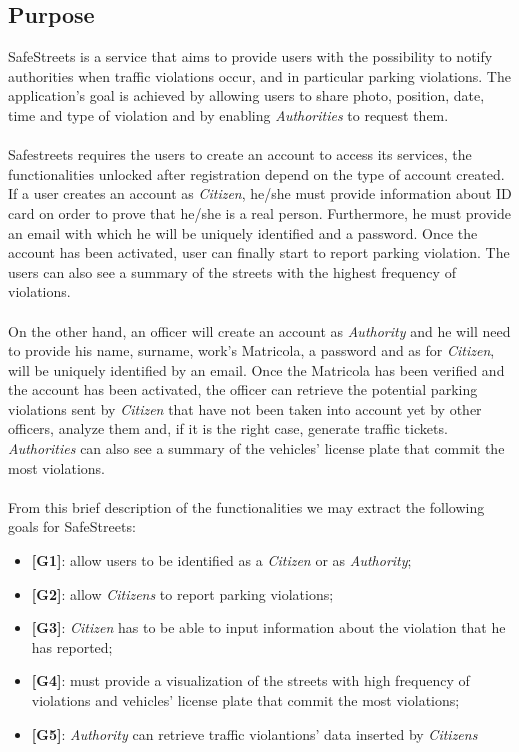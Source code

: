 \documentclass{article}
\begin{document}
\subsection{Purpose}
SafeStreets is a service that aims to provide users with the possibility to notify authorities when traffic 
violations occur, and in particular parking violations. The application's goal is achieved by allowing users 
to share photo, position, date, time and type of violation and by enabling \textit{Authorities} to request them.
\\
\\
Safestreets requires the users to create an account to access its services, the functionalities unlocked after 
registration depend on the type of account created.
\\
If a user creates an account as \textit{Citizen}, he/she must provide information about ID card on order to prove 
that he/she is a real person. Furthermore, he must provide an email with which he will be uniquely identified 
and a password. Once the account has been activated, user can finally start to report parking violation. 
The users can also see a summary of the streets with the highest frequency of violations.
\\
\\
On the other hand, an officer will create an account as \textit{Authority} and he will need to provide his name, surname, 
work's Matricola, a password and as for \textit{Citizen}, will be uniquely identified by an email. Once the Matricola 
has been verified and the account has been activated, the officer can retrieve the potential parking violations 
sent by \textit{Citizen} that have not been taken into account yet by other officers, analyze them and, if it is the 
right case, generate traffic tickets. \textit{Authorities} can also see a summary of the vehicles' license plate that 
commit the most violations.
\\
\\
From this brief description of the functionalities we may extract the following goals for SafeStreets:
\begin{itemize}
    \item \textbf{[G1]}: allow users to be identified as a \textit{Citizen} or as \textit{Authority};
    \item \textbf{[G2]}: allow \textit{Citizens} to report parking violations;
    \item \textbf{[G3]}: \textit{Citizen} has to be able to input information about the violation that he has reported;
    \item \textbf{[G4]}: must provide a visualization of the streets with high frequency of violations and vehicles' license plate that commit the most violations;
    \item \textbf{[G5]}: \textit{Authority} can retrieve traffic violantions' data inserted by \textit{Citizens}
\end{itemize}
\end{document}
